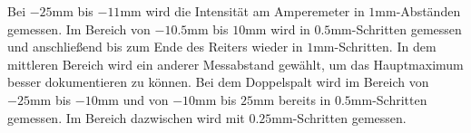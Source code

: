 \noindent Bei $-25 \unit{\milli\meter}$ bis $-11 \unit{\milli\meter}$ wird die 
Intensität am Amperemeter in $1 \unit{\milli\meter}$-Abständen gemessen.
Im Bereich von $-10.5 \unit{\milli\meter}$ bis $10 \unit{\milli\meter}$ wird
in $0.5 \unit{\milli\meter}$-Schritten gemessen und anschließend bis zum Ende 
des Reiters wieder in $1 \unit{\milli\meter}$-Schritten. In dem mittleren Bereich 
wird ein anderer Messabstand gewählt, um das Hauptmaximum besser dokumentieren 
zu können. Bei dem Doppelspalt wird im Bereich von $-25 \unit{\milli\meter}$
bis $-10 \unit{\milli\meter}$ und von $-10 \unit{\milli\meter}$ bis 
$25 \unit{\milli\meter}$ bereits in $0.5 \unit{\milli\meter}$-Schritten gemessen.
Im Bereich dazwischen wird mit $0.25 \unit{\milli\meter}$-Schritten gemessen.
